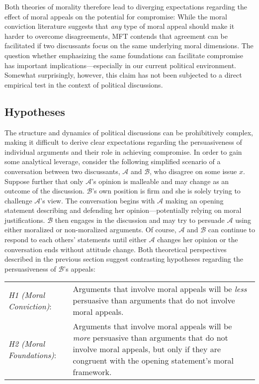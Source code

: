 Both theories of morality therefore lead to diverging expectations regarding the effect of moral appeals on the potential for compromise: While the moral conviction literature suggests that \textit{any} type of moral appeal should make it harder to overcome disagreements, MFT contends that agreement can be facilitated if two discussants focus on the same underlying moral dimensions. The question whether emphasizing the same foundations can facilitate compromise has important implications---especially in our current political environment. Somewhat surprisingly, however, this claim has not been subjected to a direct empirical test in the context of political discussions.



\subsection{Hypotheses}

The structure and dynamics of political discussions can be prohibitively complex, making it difficult to derive clear expectations regarding the persuasiveness of individual arguments and their role in achieving compromise. In order to gain some analytical leverage, consider the following simplified scenario of a conversation between two discussants, $\mathcal{A}$ and $\mathcal{B}$, who disagree on some issue $x$. Suppose further that only $\mathcal{A}$'s opinion is malleable and may change as an outcome of the discussion. $\mathcal{B}$'s own position is firm and she is solely trying to challenge $\mathcal{A}$'s view. The conversation begins with $\mathcal{A}$ making an opening statement describing and defending her opinion---potentially relying on moral justifications. $\mathcal{B}$ then engages in the discussion and may try to persuade $\mathcal{A}$ using either moralized or non-moralized arguments. Of course, $\mathcal{A}$ and $\mathcal{B}$ can continue to respond to each others' statements until either $\mathcal{A}$ changes her opinion or the conversation ends without attitude change. Both theoretical perspectives described in the previous section suggest contrasting hypotheses regarding the persuasiveness of $\mathcal{B}$'s appeals:
\begin{center}\begin{tabularx}{\textwidth}{lX}
\textit{H1 (Moral Conviction)}: & Arguments that involve moral appeals will be \textit{less} persuasive than arguments that do not involve moral appeals.\\
\textit{H2 (Moral Foundations)}: & Arguments that involve moral appeals will be \textit{more} persuasive than arguments that do not involve moral appeals, but only if they are congruent with the opening statement's moral framework.
\end{tabularx}\end{center}

